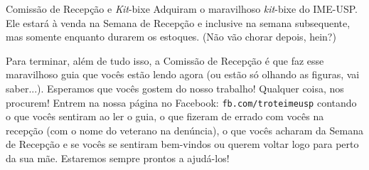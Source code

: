 \begin{secao}{Comissão de Recepção e \textit{Kit}-bixe}
Adquiram o maravilhoso \textit{kit}-bixe do IME-USP. Ele estará à venda na Semana de Recepção
e inclusive na semana subsequente, mas somente enquanto durarem os estoques. (Não vão chorar
depois, hein?)

Para terminar, além de tudo isso, a Comissão de Recepção é que faz esse maravilhoso guia que
vocês estão lendo agora (ou estão só olhando as figuras, vai
saber...). Esperamos que vocês gostem do nosso trabalho! Qualquer coisa, nos
procurem! Entrem na nossa página no Facebook: {\tt fb.com/troteimeusp} contando
o que vocês sentiram ao ler o guia, o que fizeram de errado com vocês na
recepção (com o nome do veterano na denúncia), o que vocês acharam da Semana
de Recepção e se vocês se sentiram bem-vindos ou querem voltar logo para perto
da sua mãe. Estaremos sempre prontos a ajudá-los!
\end{secao}
